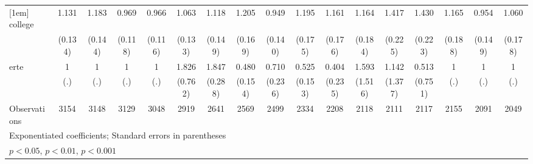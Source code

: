 {\begin{tabular}{l*{16}{c}}
[1em]
college             &       1.131         &       1.183         &       0.969         &       0.966         &       1.063         &       1.118         &       1.205         &       0.949         &       1.195         &       1.161         &       1.164         &       1.417\sym{*}  &       1.430\sym{*}  &       1.165         &       0.954         &       1.060         \\
                    &     (0.134)         &     (0.144)         &     (0.118)         &     (0.116)         &     (0.133)         &     (0.149)         &     (0.169)         &     (0.140)         &     (0.175)         &     (0.176)         &     (0.184)         &     (0.225)         &     (0.223)         &     (0.188)         &     (0.149)         &     (0.178)         \\
[1em]
erte                &           1         &           1         &           1         &           1         &       1.826         &       1.847\sym{***}&       0.480\sym{*}  &       0.710         &       0.525\sym{*}  &       0.404         &       1.593         &       1.142         &       0.513         &           1         &           1         &           1         \\
                    &         (.)         &         (.)         &         (.)         &         (.)         &     (0.762)         &     (0.288)         &     (0.154)         &     (0.236)         &     (0.153)         &     (0.235)         &     (1.516)         &     (1.377)         &     (0.751)         &         (.)         &         (.)         &         (.)         \\
\hline
Observations        &        3154         &        3148         &        3129         &        3048         &        2919         &        2641         &        2569         &        2499         &        2334         &        2208         &        2118         &        2111         &        2117         &        2155         &        2091         &        2049         \\
\hline\hline
\multicolumn{17}{l}{\footnotesize Exponentiated coefficients; Standard errors in parentheses}\\
\multicolumn{17}{l}{\footnotesize \sym{*} \(p<0.05\), \sym{**} \(p<0.01\), \sym{***} \(p<0.001\)}\\
\end{tabular}
}
